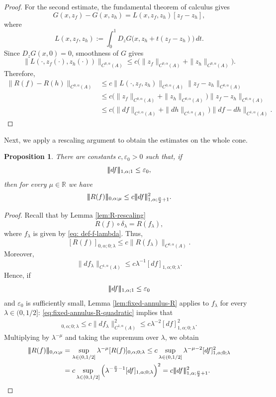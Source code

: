 \documentclass[11pt]{amsart}
\DeclarePairedDelimiter{\tnorm}{\vert\!\vert\!\vert}{\vert\!\vert\!\vert}
\newtheorem{proposition}{Proposition}
\theoremstyle{definition}
\theoremstyle{remark}
\begin{document}
\begin{proof}
For the second estimate, the fundamental theorem of calculus gives
\[
    G(x,z_f)-G(x,z_h)
    =
    L(x,z_f,z_h)[z_f-z_h],
\]
where
\[
    L(x,z_f,z_h)
    :=
    \int_0^1
    D_zG\bigl(x,z_h+t(z_f-z_h)\bigr)\,dt .
\]
Since \(D_zG(x,0)=0\), smoothness of \(G\) gives
\[
    \|L(\cdot,z_f(\cdot),z_h(\cdot))\|_{C^{0,\alpha}(A)}
    \le
    c\bigl(
        \|z_f\|_{C^{0,\alpha}(A)}
        +
        \|z_h\|_{C^{0,\alpha}(A)}
    \bigr).
\]
Therefore,
\[
\begin{aligned}
    \|R(f)-R(h)\|_{C^{0,\alpha}(A)}
    &\le
    c\|L(\cdot,z_f,z_h)\|_{C^{0,\alpha}(A)}
    \|z_f-z_h\|_{C^{0,\alpha}(A)} \\
    &\le
    c\bigl(
        \|z_f\|_{C^{0,\alpha}(A)}
        +
        \|z_h\|_{C^{0,\alpha}(A)}
    \bigr)
    \|z_f-z_h\|_{C^{0,\alpha}(A)} \\
    &\le
    c\bigl(
        \|df\|_{C^{1,\alpha}(A)}
        +
        \|dh\|_{C^{1,\alpha}(A)}
    \bigr)
    \|df-dh\|_{C^{1,\alpha}(A)}.
\end{aligned}
\]
\end{proof}

Next, we apply a rescaling argument to obtain the estimates on the whole cone. 

\begin{proposition}\label{prop: bound-Rf}
There are constants \(c,\varepsilon_0>0\) such that, if
\[
    \tnorm{df}_{1,\alpha;1}\le \varepsilon_0,
\]
then for every \(\mu\in\mathbb R\) we have
\[
    \tnorm{R(f)}_{0,\alpha;\mu}
    \le
    c\tnorm{df}_{1,\alpha;\frac{\mu}{2}+1}^{2}.
\]
\end{proposition}
\begin{proof}
Recall that by Lemma \ref{lem:R-rescaling}
\[
    R(f)\circ\delta_\lambda=R(f_\lambda),
\]
where $f_\lambda$ is given by \eqref{eq: def-f-lambda}.
Thus, 
\[
    [R(f)]_{0,\alpha;0;\lambda}
    \le c\|R(f_\lambda)\|_{C^{0,\alpha}(A)}.
\]
Moreover,
\[
    \|df_\lambda\|_{C^{1,\alpha}(A)}
    \le
    c\lambda^{-1}[df]_{1,\alpha;0;\lambda}.
\]
Hence, if
\[
    \tnorm{df}_{1,\alpha;1}\le \varepsilon_0
\]
and \(\varepsilon_0\) is sufficiently small, Lemma
\ref{lem:fixed-annulus-R} applies to \(f_\lambda\) for every
\(\lambda\in(0,1/2]\): \eqref{eq:fixed-annulus-R-quadratic} implies that
\begin{align*}
    [R(f)]_{0,\alpha;0;\lambda}
    \le
    c\|df_\lambda\|_{C^{1,\alpha}(A)}^2 \le
    c\lambda^{-2}[df]_{1,\alpha;0;\lambda}^2.
\end{align*}
Multiplying by \(\lambda^{-\mu}\) and taking the supremum over \(\lambda\), we
obtain
\[
\begin{aligned}
    \tnorm{R(f)}_{0,\alpha;\mu}
    &=
    \sup_{\lambda\in(0,1/2]}
    \lambda^{-\mu}[R(f)]_{0,\alpha;0;\lambda} \le
    c\sup_{\lambda\in(0,1/2]}
    \lambda^{-\mu-2}[df]_{1,\alpha;0;\lambda}^2 \\
    &=
    c\sup_{\lambda\in(0,1/2]}
    \left(
        \lambda^{-\frac{\mu}{2}-1}[df]_{1,\alpha;0;\lambda}
    \right)^2 =
    c\tnorm{df}_{1,\alpha;\frac{\mu}{2}+1}^{2}.
\end{aligned}
\]
\end{proof}
\end{document}
